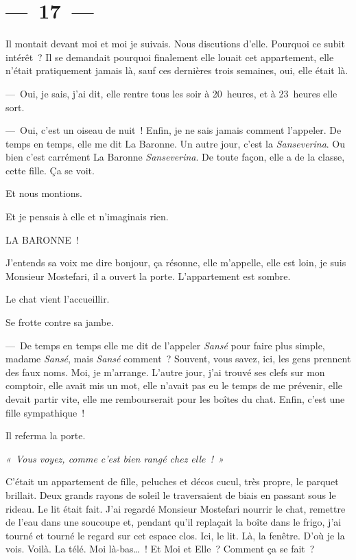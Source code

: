 \documentclass[twoside]{book} %
\begin{document}
\section[{— 17 —}]{— 17 —}
\renewcommand{\leftmark}{— 17 —}

\noindent Il montait devant moi et moi je suivais. Nous discutions d’elle. Pourquoi ce subit intérêt ? Il se demandait pourquoi finalement elle louait cet appartement, elle n’était pratiquement jamais là, sauf ces dernières trois semaines, oui, elle était là.\par
— Oui, je sais, j’ai dit, elle rentre tous les soir à 20 heures, et à 23 heures elle sort.\par
— Oui, c’est un oiseau de nuit ! Enfin, je ne sais jamais comment l’appeler. De temps en temps, elle me dit La Baronne. Un autre jour, c’est la \emph{Sanseverina}. Ou bien c’est carrément La Baronne \emph{Sanseverina}. De toute façon, elle a de la classe, cette fille. Ça se voit.\par
Et nous montions.\par
Et je pensais à elle et n’imaginais rien.\par
LA BARONNE !\par
J’entends sa voix me dire bonjour, ça résonne, elle m’appelle, elle est loin, je suis Monsieur Mostefari, il a ouvert la porte. L’appartement est sombre.\par
Le chat vient l’accueillir.\par
Se frotte contre sa jambe.\par
— De temps en temps elle me dit de l’appeler\emph{ Sansé} pour faire plus simple, madame \emph{Sansé}, mais \emph{Sansé} comment ? Souvent, vous savez, ici, les gens prennent des faux noms. Moi, je m’arrange. L’autre jour, j’ai trouvé ses clefs sur mon comptoir, elle avait mis un mot, elle n’avait pas eu le temps de me prévenir, elle devait partir vite, elle me rembourserait pour les boîtes du chat. Enfin, c’est une fille sympathique !\par
Il referma la porte.\par
{\itshape « Vous voyez, comme c’est bien rangé chez elle ! »\par}
C’était un appartement de fille, peluches et décos cucul, très propre, le parquet brillait. Deux grands rayons de soleil le traversaient de biais en passant sous le rideau. Le lit était fait. J’ai regardé Monsieur Mostefari nourrir le chat, remettre de l’eau dans une soucoupe et, pendant qu’il replaçait la boîte dans le frigo, j’ai tourné et tourné le regard sur cet espace clos. Ici, le lit. Là, la fenêtre. D’où je la vois. Voilà. La télé. Moi là-bas… ! Et Moi et Elle ? Comment ça se fait ?\par
\end{document}
